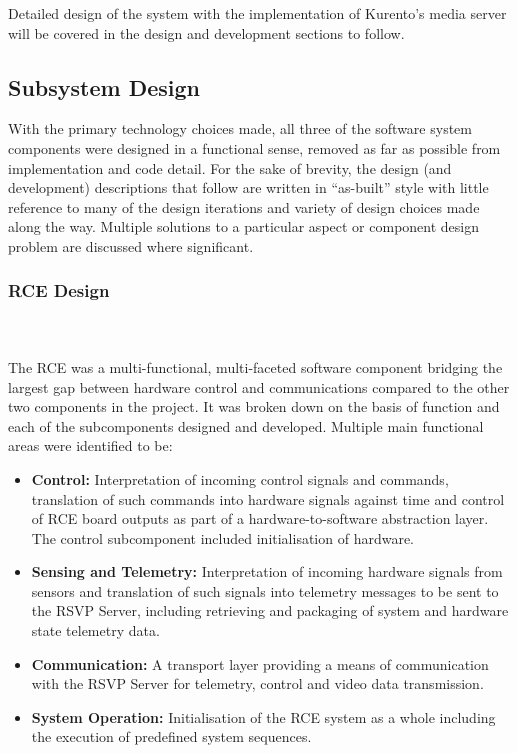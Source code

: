       Detailed design of the system with the implementation of Kurento's media server will be covered in the design and development sections to follow.
  \subsection{Subsystem Design}
    With the primary technology choices made, all three of the software system components were designed in a functional sense, removed as far as possible from implementation and code detail. For the sake of brevity, the design (and development) descriptions that follow are written in ``as-built'' style with little reference to many of the design iterations and variety of design choices made along the way. Multiple solutions to a particular aspect or component design problem are discussed where significant.
        
    \subsubsection{RCE Design}
    \label{subsubsec:softDesign-rceDesign}
      \\\\
        The RCE was a multi-functional, multi-faceted software component bridging the largest gap between hardware control and communications compared to the other two components in the project. It was broken down on the basis of function and each of the subcomponents designed and developed. Multiple main functional areas were identified to be:
        
        \begin{itemize}
          \item \textbf{Control:} Interpretation of incoming control signals and commands, translation of such commands into hardware signals against time and control of RCE board outputs as part of a hardware-to-software abstraction layer. The control subcomponent included initialisation of hardware.
          \item \textbf{Sensing and Telemetry:} Interpretation of incoming hardware signals from sensors and translation of such signals into telemetry messages to be sent to the RSVP Server, including retrieving and packaging of system and hardware state telemetry data.
          \item \textbf{Communication:} A transport layer providing a means of communication with the RSVP Server for telemetry, control and video data transmission.
          \item \textbf{System Operation:} Initialisation of the RCE system as a whole including the execution of predefined system sequences.
        \end{itemize}
        
